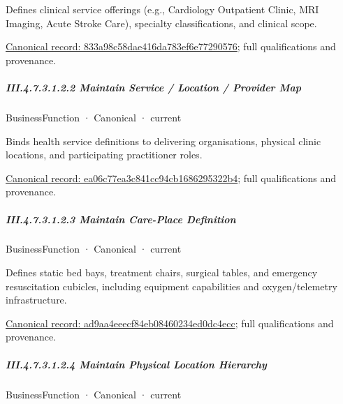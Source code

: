 Defines clinical service offerings (e.g., Cardiology Outpatient Clinic, MRI Imaging, Acute Stroke Care), specialty classifications, and clinical scope.


{\footnotesize \href{../../../../../../../../continuum/business/business-function/833a98c58dae416da783ef6e77290576.md}{Canonical record: 833a98c58dae416da783ef6e77290576}; full qualifications and provenance.}\par
\subparagraph*{III.4.7.3.1.2.2 Maintain Service / Location / Provider Map}
\label{navigation:III.4.7.3.1.2.2}

\label{element:ea06c77ea3c841cc94cb1686295322b4}
{\small BusinessFunction · Canonical · current}\par

Binds health service definitions to delivering organisations, physical clinic locations, and participating practitioner roles.


{\footnotesize \href{../../../../../../../../continuum/business/business-function/ea06c77ea3c841cc94cb1686295322b4.md}{Canonical record: ea06c77ea3c841cc94cb1686295322b4}; full qualifications and provenance.}\par
\subparagraph*{III.4.7.3.1.2.3 Maintain Care-Place Definition}
\label{navigation:III.4.7.3.1.2.3}

\label{element:ad9aa4eeecf84eb08460234ed0dc4ecc}
{\small BusinessFunction · Canonical · current}\par

Defines static bed bays, treatment chairs, surgical tables, and emergency resuscitation cubicles, including equipment capabilities and oxygen/telemetry infrastructure.


{\footnotesize \href{../../../../../../../../continuum/business/business-function/ad9aa4eeecf84eb08460234ed0dc4ecc.md}{Canonical record: ad9aa4eeecf84eb08460234ed0dc4ecc}; full qualifications and provenance.}\par
\subparagraph*{III.4.7.3.1.2.4 Maintain Physical Location Hierarchy}
\label{navigation:III.4.7.3.1.2.4}

\label{element:d217a5cd3a3d40e9a89068d1680ec45f}
{\small BusinessFunction · Canonical · current}\par

